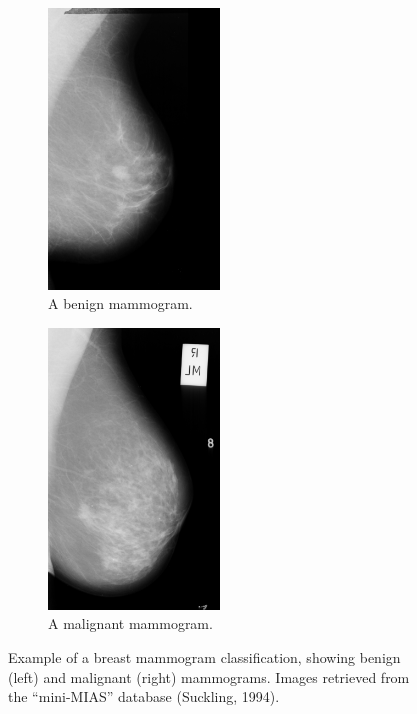 \begin{figure}[h]
\centering
\begin{subfigure}{.5\textwidth}
  \centering
  \includegraphics[width=0.5\textwidth]{Dissertation/figures/litsurvey/classification_benign.png}
  \caption{A benign mammogram.}
  \label{fig:classification_benign}
\end{subfigure}%
\begin{subfigure}{.5\textwidth}
  \centering
  \includegraphics[width=0.5\textwidth]{Dissertation/figures/litsurvey/classification_malignant.png}
  \caption{A malignant mammogram.}
  \label{fig:classification_malignant}
\end{subfigure}
\caption{\label{fig:classification_example}Example of a breast mammogram classification, showing benign (left) and malignant (right) mammograms. Images retrieved from the ``mini-MIAS'' database (Suckling, 1994).}
\end{figure}

